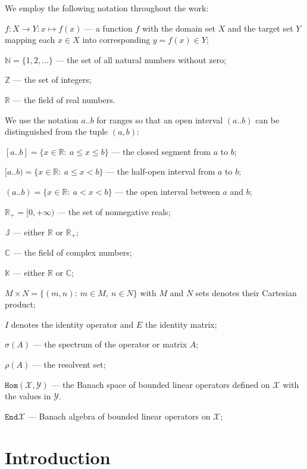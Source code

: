 \documentclass[a4paper]{article}
\theoremstyle{definition}
\begin{document}
We employ the following notation throughout the work:

\( f: X\to Y: x\mapsto f(x) \) --- a function \( f \)
with the domain set \( X \) and the target set \( Y \)
mapping each \( x\in X \) into corresponding \( y=f(x) \in Y\);

\( \mathbb{N} = \{ 1, 2, \ldots \}\) --- the set of all natural numbers without zero;

\( \mathbb{Z} \) --- the set of integers;

\( \mathbb{R} \) --- the field of real numbers.

We use the notation \( a..b \) for ranges so that an open interval \( (a..b) \)
can be distinguished from the tuple \( (a, b) \):

\( [a..b] = \{ x\in\mathbb{R}:\ a\leq x\leq b\} \) --- the closed segment from
\( a \) to \( b \);

\( [a..b) = \{ x\in\mathbb{R}:\ a\leq x < b\} \) --- the half-open interval from
\( a \) to \( b \);

\( (a..b) = \{ x\in\mathbb{R}:\ a < x < b\} \) --- the open interval between
\( a \) and \( b \);

\( \mathbb{R}_+ = [0,+\infty) \) --- the set of nonnegative reals;

\( \mathbb{J} \) --- either \( \mathbb{R} \) or \( \mathbb{R}_+ \);

\( \mathbb{C} \) --- the field of complex numbers;

\( \mathbb{K} \) --- either \( \mathbb{R} \) or \( \mathbb{C} \);

\( M{\times}N = \{ (m, n):\ m{\in}M,\ n{\in}N \} \) with \( M \) and \( N \) sets
denotes their Cartesian product;

\( I \) denotes the identity operator and \( E \) the identity matrix;

\( \sigma(A) \) --- the spectrum of the operator or matrix \( A \);

\( \rho(A) \) --- the resolvent set;

\( \mathtt{Hom}(\mathscr{X}, \mathscr{Y})\) --- the Banach space of bounded
linear operators defined on \( \mathscr{X} \) with the values in \( \mathscr{Y} \).

\( \mathtt{End}\mathscr{X} \) --- Banach algebra of bounded linear operators on
\( \mathscr{X} \);

\newpage

\section*{Introduction}
\newpage
\end{document}
